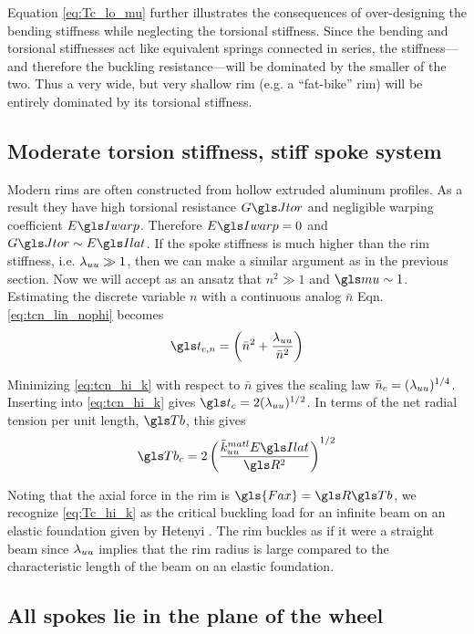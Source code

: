 \documentclass[\rootdir/thesis.tex]{subfiles}
\begin{document}
Equation \eqref{eq:Tc_lo_mu} further illustrates the consequences of over-designing the bending stiffness while neglecting the torsional stiffness. Since the bending and torsional stiffnesses act like equivalent springs connected in series, the stiffness---and therefore the buckling resistance---will be dominated by the smaller of the two. Thus a very wide, but very shallow rim (e.g. a ``fat-bike'' rim) will be entirely dominated by its torsional stiffness.

\subsection{Moderate torsion stiffness, stiff spoke system}
Modern rims are often constructed from hollow extruded aluminum profiles. As a result they have high torsional resistance $\GJ$ and negligible warping coefficient $\EIw$. Therefore $\EIw=0$ and $\GJ \sim \EIl$. If the spoke stiffness is much higher than the rim stiffness, i.e. $\lambda_{uu} \gg 1$, then we can make a similar argument as in the previous section. Now we will accept as an ansatz that $n^2 \gg 1$ and $\m \sim 1$. Estimating the discrete variable $n$ with a continuous analog $\bar{n}$ Eqn. \eqref{eq:tcn_lin_nophi} becomes
\begin{equation}
\label{eq:tcn_hi_k}
\ts_{c,n} = \left(\bar{n}^2 + \frac{\lr_{uu}}{\bar{n}^2}\right)
\end{equation}

Minimizing \eqref{eq:tcn_hi_k} with respect to $\bar{n}$ gives the scaling law $\bar{n}_c=(\lambda_{uu})^{1/4}$. Inserting into \eqref{eq:tcn_hi_k} gives $\ts_c = 2(\lr_{uu})^{1/2}$. In terms of the net radial tension per unit length, $\Tb$, this gives
\begin{equation}
\label{eq:Tc_hi_k}
\Tb_c = 2 \left(\frac{\matl{\kuu}\EIl}{\R^2}\right)^{1/2}
\end{equation}

Noting that the axial force in the rim is $\gls{Fax}=\R\Tb$, we recognize \eqref{eq:Tc_hi_k} as the critical buckling load for an infinite beam on an elastic foundation given by Hetenyi \cite{Hetenyi1946}. The rim buckles as if it were a straight beam since $\lambda_{uu}$ implies that the rim radius is large compared to the characteristic length of the beam on an elastic foundation.

\subsection{All spokes lie in the plane of the wheel}
\end{document}
